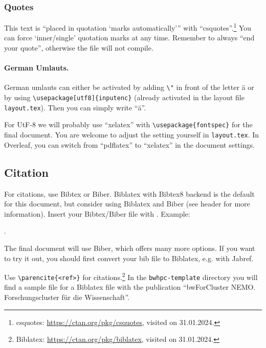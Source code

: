 \documentclass[
  paper       = a4,
  headheight  = 16pt,
  footheight  = 16pt,
  fontsize    = 10pt,
  twoside     = true,
  titlepage   = true,
]{scrartcl}
\begin{document}
\subsubsection{Quotes}

This text is \enquote{placed in quotation \enquote{marks automatically}} with \enquote{csquotes}.\footnote{csquotes: \url{https://ctan.org/pkg/csquotes}, visited on 31.01.2024.}
You can force \enquote*{inner/single} quotation marks at any time.
Remember to always \enquote{end your quote}, otherwise the file will not compile.


\paragraph{German Umlauts.}

German umlauts can either be activated by adding \lstinline|\"| in front of the letter \"a or by using \verb|\usepackage[utf8]{inputenc}| (already activated in the layout file \lstinline|layout.tex|).
Then you can simply write \enquote{ä}.

For UtF-8 we will probably use \enquote{xelatex} with \verb|\usepackage{fontspec}| for the final document.
You are welcome to adjust the setting yourself in \lstinline|layout.tex|.
In Overleaf, you can switch from \enquote{pdflatex} to \enquote{xelatex} in the document settings.


\subsection{Citation}

For citations, use Bibtex or Biber. Biblatex with Bibtex8 backend is the default for this document, but consider using Biblatex and Biber (see header for more information). Insert your Bibtex/Biber file with \verb||. Example:

\verb||.

The final document will use Biber, which offers many more options.
If you want to try it out, you should first convert your bib file to Biblatex, e.g. with Jabref.

Use \verb|\parencite{<ref>}| for citations.\footnote{Biblatex: \url{https://ctan.org/pkg/biblatex}, visited on 31.01.2024.}
In the \verb|bwhpc-template| directory you will find a sample file for a Biblatex file with the publication \enquote{bwForCluster NEMO. Forschungscluster für die Wissenschaft}\parencite{bwhpc2019:janczyk_bwforcluster}.
\end{document}
